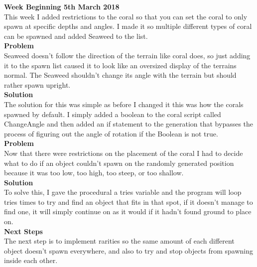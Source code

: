 \documentclass[10pt, a4paper]{article}
\begin{document}
	\textbf{Week Beginning 5th March 2018}\\
	This week I added restrictions to the coral so that you can set the coral to only spawn at specific
	depths and angles. I made it so multiple different types of coral can be spawned and added Seaweed
	to the list.\\
	\textbf{Problem}\\
	Seaweed doesn't follow the direction of the terrain like coral does, so just adding it to the spawn list
	caused it to look like an oversized display of the terrains normal. The Seaweed shouldn't change its
	angle with the terrain but should rather spawn upright.\\
	\textbf{Solution}\\
	The solution for this was simple as before I changed it this was how the corals spawned by default. I
	simply added a boolean to the coral script called ChangeAngle and then added an if statement to the
	generation that bypasses the process of figuring out the angle of rotation if the Boolean is not true.\\
	\textbf{Problem}\\
	Now that there were restrictions on the placement of the coral I had to decide what to do if an
	object couldn't spawn on the randomly generated position because it was too low, too high, too
	steep, or too shallow.\\
	\textbf{Solution}\\
	To solve this, I gave the procedural a tries variable and the program will loop tries times to try and
	find an object that fits in that spot, if it doesn't manage to find one, it will simply continue on as it
	would if it hadn't found ground to place on.\\
	\textbf{Next Steps}\\
	The next step is to implement rarities so the same amount of each different object doesn't spawn
	everywhere, and also to try and stop objects from spawning inside each other.\\\\
	
\end{document}
